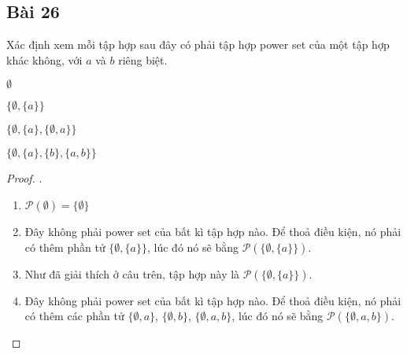\subsection*{Bài 26}
Xác định xem mỗi tập hợp sau đây có phải tập hợp power set của một tập hợp khác không, với $a$ và $b$ riêng biệt.
\begin{enumerate}[label=\alph*)]
    \begin{multicols}{2}
        \item $\emptyset$
        \item $\{\emptyset,\{a\}\}$
        \item $\{\emptyset,\{a\},\{\emptyset,a\}\}$
        \item $\{\emptyset,\{a\},\{b\},\{a,b\}\}$
    \end{multicols}
\end{enumerate}
\begin{proof}.
    \begin{enumerate}[label=\alph*)]
        \item $\mathcal{P}(\emptyset)=\{\emptyset\}$
        \item Đây không phải power set của bất kì tập hợp nào. Để thoả điều kiện, nó phải có thêm phần tử $\{\emptyset,\{a\}\}$, lúc đó nó sẽ bằng $\mathcal{P}(\{\emptyset,\{a\}\})$.
        \item Như đã giải thích ở câu trên, tập hợp này là $\mathcal{P}(\{\emptyset,\{a\}\})$.
        \item Đây không phải power set của bất kì tập hợp nào. Để thoả điều kiện, nó phải có thêm các phần tử $\{\emptyset,a\}$, $\{\emptyset,b\}$, $\{\emptyset,a,b\}$, lúc đó nó sẽ bằng $\mathcal{P}(\{\emptyset,a,b\})$.
    \end{enumerate}
\end{proof}
